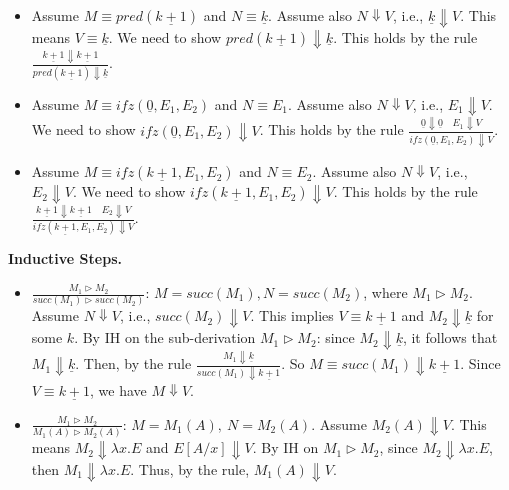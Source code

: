\begin{solution}
\begin{itemize}
        \item Assume $M \equiv pred(\underline{k+1})$ and $N \equiv \underline{k}$.
              Assume also $N \Downarrow V$, i.e., $\underline{k} \Downarrow V$. This means $V \equiv \underline{k}$.
              We need to show $pred(\underline{k+1}) \Downarrow \underline{k}$. This holds by the rule $\frac{\underline{k+1} \Downarrow \underline{k+1}}{pred(\underline{k+1}) \Downarrow \underline{k}}$.

        \item Assume $M \equiv ifz(\underline{0}, E_1, E_2)$ and $N \equiv E_1$.
              Assume also $N \Downarrow V$, i.e., $E_1 \Downarrow V$.
              We need to show $ifz(\underline{0}, E_1, E_2) \Downarrow V$. This holds by the rule $\frac{\underline{0} \Downarrow \underline{0} \quad E_1 \Downarrow V}{ifz(\underline{0}, E_1, E_2) \Downarrow V}$.

        \item Assume $M \equiv ifz(\underline{k+1}, E_1, E_2)$ and $N \equiv E_2$.
              Assume also $N \Downarrow V$, i.e., $E_2 \Downarrow V$.
              We need to show $ifz(\underline{k+1}, E_1, E_2) \Downarrow V$. This holds by the rule $\frac{\underline{k+1} \Downarrow \underline{k+1} \quad E_2 \Downarrow V}{ifz(\underline{k+1}, E_1, E_2) \Downarrow V}$.
    \end{itemize}

    \textbf{Inductive Steps.}
    \begin{itemize}
        \item $\frac{M_1 \rhd M_2}{succ(M_1) \rhd succ(M_2)}$: $M = succ(M_1), N = succ(M_2)$, where $M_1 \rhd M_2$. Assume $N \Downarrow V$, i.e., $succ(M_2) \Downarrow V$. 
              This implies $V \equiv \underline{k+1}$ and $M_2 \Downarrow \underline{k}$ for some $k$.
              By IH on the sub-derivation $M_1 \triangleright M_2$: since $M_2 \Downarrow \underline{k}$, it follows that $M_1 \Downarrow \underline{k}$.
              Then, by the rule $\frac{M_1 \Downarrow \underline{k}}{succ(M_1) \Downarrow \underline{k+1}}$.
              So $M \equiv succ(M_1) \Downarrow \underline{k+1}$. Since $V \equiv \underline{k+1}$, we have $M \Downarrow V$.
 

        \item $\frac{M_1 \rhd M_2}{M_1(A) \rhd M_2(A)}$: $M = M_1(A),\ N = M_2(A)$. Assume $M_2(A) \Downarrow V$. 
              This means $M_2 \Downarrow \lambda x.E$ and $E[A/x] \Downarrow V$. By IH on $M_1 \rhd M_2$, since $M_2 \Downarrow \lambda x.E$, 
                then $M_1 \Downarrow \lambda x.E$. Thus, by the rule, $M_1(A) \Downarrow V$.
    

\end{itemize}
\end{solution}
